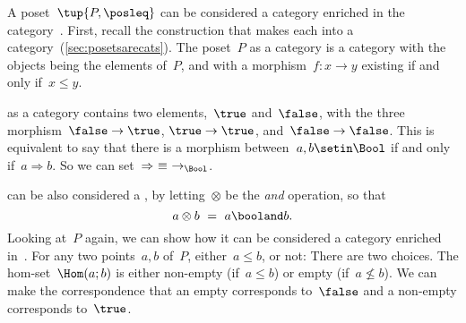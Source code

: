 {    \begin{example}
        A poset~$\tup{P, {\posleq}}$ can be considered a category enriched in the category~\Bool.
        First, recall the construction that makes each  into a category~(\cref{sec:posetsarecats}).
        The poset~$P$ as a category is a category with the objects being the elements of~$P$, and with a morphism~$f\colon x \to y$ existing if and only if~$x\leq y$.

        \Bool as a category contains two elements,~$\true$ and~$\false$, with the three morphism~$\false \to \true$, $\true \to \true$, and~$\false \to \false$.
        This is equivalent to say that there is a morphism between~$a, b \setin \Bool$ if and only if~$a \Rightarrow b$.
        So we can set~$\Rightarrow\ \equiv\ \to_{\Bool}$.

        \Bool can be also considered a , by letting~$\otimes$ be the \emph{and} operation, so that
        \begin{equation}
            a \otimes b\ =\ a \booland b.
        \end{equation}
        Looking at~$P$ again, we can show how it can be considered a category enriched in~\Bool.
        For any two points~$a, b$ of~$P$, either~$a \leq b$, or not: There are two choices.
        The hom-set~$\Hom(a; b)$ is either non-empty (if~$a \leq b$) or empty (if~$a \not\leq b$).
        We can make the correspondence that an empty  corresponds to~$\false$ and a non-empty  corresponds to~$\true$.


\end{example}}
